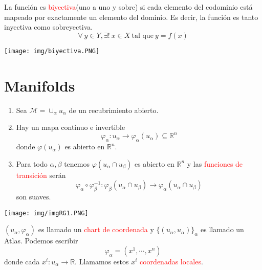 \documentclass[../main]{subfiles}
\begin{document}
\begin{itemize}
    \begin{minipage}{0.5\textwidth}
        La función es \textcolor{red}{biyectiva}(uno a uno y sobre) si cada elemento del codominio está mapeado por exactamente un elemento del dominio. Es decir, la función es tanto inyectiva como sobreyectiva.
        \begin{equation}
            \forall \ y\in Y, \exists ! \ x\in X \ \text{tal que} \ y=f(x)
        \end{equation}  
    \end{minipage}
    \begin{minipage}{0.5\textwidth}
        \begin{center}
            \texttt{[image: img/biyectiva.PNG]}
        \end{center}
    \end{minipage}
\end{itemize}
\section{Manifolds}\label{part1.2}

\begin{enumerate}
    \item Sea $\mathcal{M}=\cup_{\alpha} u_{\alpha}$ de un recubrimiento abierto.
    \item Hay un mapa continuo e invertible
    \begin{equation}
        \varphi_{\alpha}: u_{\alpha} \rightarrow \varphi_{\alpha}(u_{\alpha}) \subseteq \mathbb{R}^n
    \end{equation}
    donde $\varphi(u_{\alpha})$ es abierto en $\mathbb{R}^n$.
    \item Para todo $\alpha, \beta$ tenemos $\varphi(u_{\alpha} \cap u_{\beta})$ es abierto en $\mathbb{R}^n$ y las \textcolor{red}{funciones de transición} serán
    \begin{equation}
        \varphi_{\alpha} \circ \varphi_{\beta}^{-1}: \varphi_{\beta}(u_{\alpha} \cap u_{\beta})\rightarrow \varphi_{\alpha}(u_{\alpha} \cap u_{\beta})
    \end{equation}
    son suaves.
\end{enumerate}

\begin{center}
    \texttt{[image: img/imgRG1.PNG]}
\end{center}
$(u_{\alpha}, \varphi_{\alpha})$ es llamado un \textcolor{red}{chart de coordenada} y $\{(u_{\alpha}, u_{\alpha})\}_{\alpha}$ es llamado un Atlas. Podemos escribir
\begin{equation}
    \varphi_{\alpha}=(x^1, \cdots, x^n)
\end{equation}
donde cada $x^{i}:u_{\alpha}\rightarrow \mathbb{R}$. Llamamos estos $x^{i}$ \textcolor{red}{coordenadas locales}.
\end{document}
